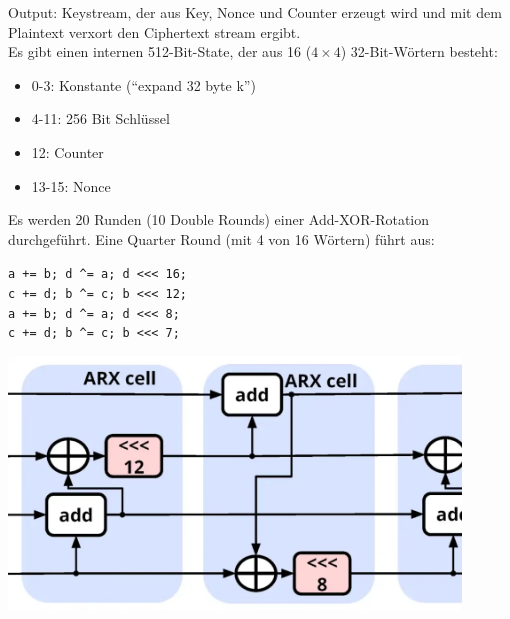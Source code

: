 \noindent Output: Keystream, der aus Key, Nonce und Counter erzeugt wird und mit dem Plaintext verxort den Ciphertext stream ergibt.\\

Es gibt einen internen 512-Bit-State, der aus 16 ($4\times 4$) 32-Bit-Wörtern besteht:
\begin{itemize}
    \item 0-3: Konstante (``expand 32 byte k'')
    \item 4-11: 256 Bit Schlüssel 
    \item 12: Counter
    \item 13-15: Nonce
\end{itemize}

Es werden 20 Runden (10 Double Rounds) einer Add-XOR-Rotation durchgeführt. Eine Quarter Round (mit 4 von 16 Wörtern) führt aus:

\begin{minipage}[c]{0.48\textwidth}
        \verb|a += b; d ^= a; d <<< 16;| \\
        \verb|c += d; b ^= c; b <<< 12;| \\
        \verb|a += b; d ^= a; d <<< 8;| \\
        \verb|c += d; b ^= c; b <<< 7;|
\end{minipage} \begin{minipage}[c]{0.48\textwidth}
    \centering
    \includegraphics[width=0.9\textwidth]{figures/fig07-chacha20-1024x576.png}
\end{minipage}

